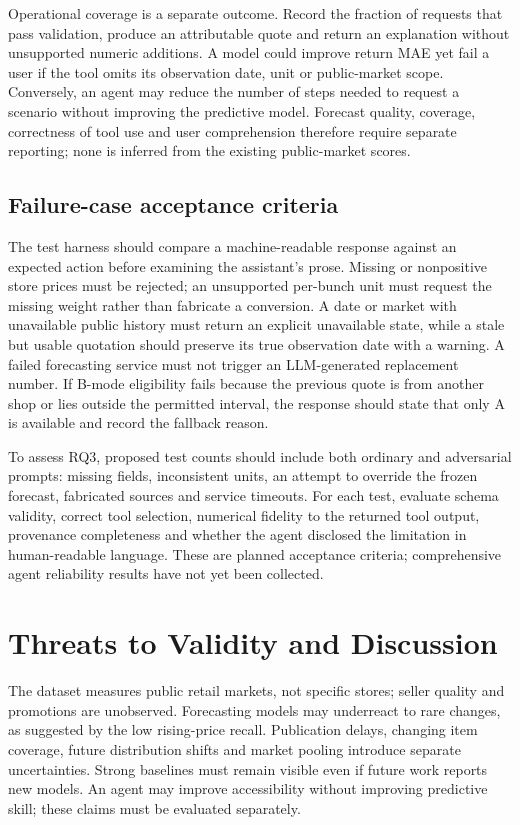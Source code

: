\documentclass[conference]{IEEEtran}
\begin{document}
Operational coverage is a separate outcome. Record the fraction of requests that pass validation, produce an attributable quote and return an explanation without unsupported numeric additions. A model could improve return MAE yet fail a user if the tool omits its observation date, unit or public-market scope. Conversely, an agent may reduce the number of steps needed to request a scenario without improving the predictive model. Forecast quality, coverage, correctness of tool use and user comprehension therefore require separate reporting; none is inferred from the existing public-market scores.

\subsection{Failure-case acceptance criteria}
The test harness should compare a machine-readable response against an expected action before examining the assistant's prose. Missing or nonpositive store prices must be rejected; an unsupported per-bunch unit must request the missing weight rather than fabricate a conversion. A date or market with unavailable public history must return an explicit unavailable state, while a stale but usable quotation should preserve its true observation date with a warning. A failed forecasting service must not trigger an LLM-generated replacement number. If B-mode eligibility fails because the previous quote is from another shop or lies outside the permitted interval, the response should state that only A is available and record the fallback reason.

To assess RQ3, proposed test counts should include both ordinary and adversarial prompts: missing fields, inconsistent units, an attempt to override the frozen forecast, fabricated sources and service timeouts. For each test, evaluate schema validity, correct tool selection, numerical fidelity to the returned tool output, provenance completeness and whether the agent disclosed the limitation in human-readable language. These are planned acceptance criteria; comprehensive agent reliability results have not yet been collected.

\section{Threats to Validity and Discussion}
The dataset measures public retail markets, not specific stores; seller quality and promotions are unobserved. Forecasting models may underreact to rare changes, as suggested by the low rising-price recall. Publication delays, changing item coverage, future distribution shifts and market pooling introduce separate uncertainties. Strong baselines must remain visible even if future work reports new models. An agent may improve accessibility without improving predictive skill; these claims must be evaluated separately.
\end{document}

